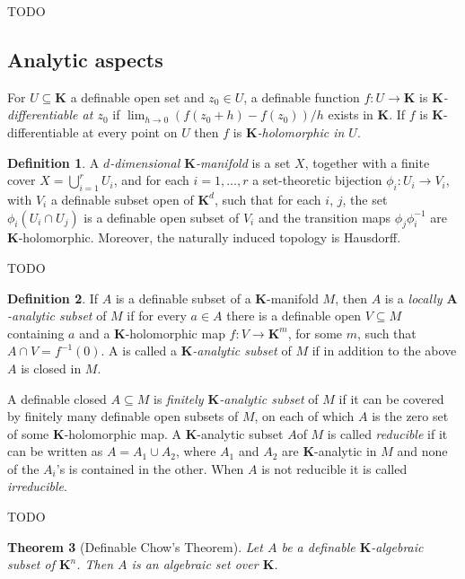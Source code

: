 \documentclass{amsart}
\newtheorem{theorem}{Theorem}[subsection]
\theoremstyle{definition}
\newtheorem{definition}[theorem]{Definition}
\numberwithin{equation}{section}
\begin{document}
TODO

\subsection{Analytic aspects}
For $U \subseteq \mathbf{K}$ a definable open set and $z_0 \in U$,
a definable function $f: U \to \mathbf{K}$ is \emph{$\mathbf{K}$-differentiable at $z_0$} if $\lim_{h\to 0}(f(z_0+h) - f(z_0))/h$ exists in $\mathbf{K}$.
If $f$ is $\mathbf{K}$-differentiable at every point on $U$ then
$f$ is \emph{$\mathbf{K}$-holomorphic in $U$}.

\begin{definition}
  A \emph{$d$-dimensional $\mathbf{K}$-manifold} is a set $X$,
  together with a finite cover $X = \bigcup_{i=1}^r U_i$,
  and for each $i = 1,\dots,r$ a set-theoretic bijection $\phi_i: U_i \to V_i$,
  with $V_i$ a definable subset open of $\mathbf{K}^d$,
  such that for each $i$, $j$,
  the set $\phi_i(U_i \cap U_j)$ is a definable open subset of $V_i$ and the transition maps $\phi_j \phi_i^{-1}$ are $\mathbf{K}$-holomorphic.
  Moreover, the naturally induced topology is Hausdorff.
\end{definition}

TODO

\begin{definition}
  If $A$ is a definable subset of a $\mathbf{K}$-manifold $M$,
  then $A$ is a \emph{locally $\mathbf{A}$-analytic subset} of $M$ 
  if for every $a\in A$ there is a definable open $V \subseteq M$ containing $a$ and a $\mathbf{K}$-holomorphic map $f : V \to \mathbf{K}^m$, 
  for some $m$, such that $A\cap V= f^{-1}(0)$.
  A is called a \emph{$\mathbf{K}$-analytic subset} of $M$ if in addition to the above $A$ is closed in $M$.

  A definable closed $A \subseteq M$ is \emph{finitely $\mathbf{K}$-analytic subset} of $M$ if it can be covered by finitely many definable open subsets of $M$, 
  on each of which $A$ is the zero set of some $\mathbf{K}$-holomorphic map.
  A $\mathbf{K}$-analytic subset $A $of $M$ is called \emph{reducible} if it can be written as $A= A_1 \cup A_2$,
  where $A_1$ and $A_2$ are $\mathbf{K}$-analytic in $M$ and none of the $A_i$'s is contained in the other.
  When $A$ is not reducible it is called \emph{irreducible}. 
\end{definition}

TODO

\begin{theorem}[Definable Chow's Theorem]
  Let $A$ be a definable $\mathbf{K}$-algebraic subset of $\mathbf{K}^n$.
  Then $A$ is an algebraic set over $\mathbf{K}$.
\end{theorem}
\end{document}
